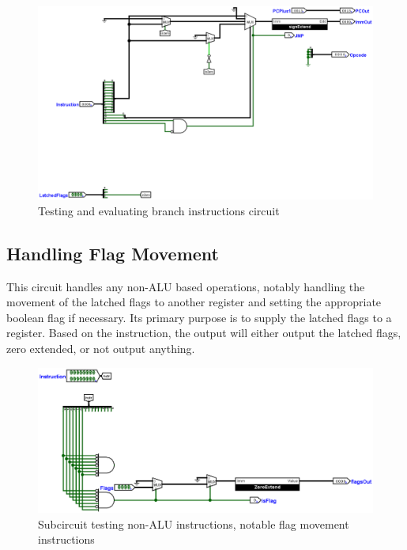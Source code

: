 \documentclass[12pt, letter]{article}
\begin{document}
 	  \begin{figure}[h]
 	  	\centering
 	  	\includegraphics[scale = 0.25]{ConditionalCircuit}
 	  	\caption{Testing and evaluating branch instructions circuit}
 	  	\label{fig:ConditionalCircuit}
 	  \end{figure}
   
   \subsection{Handling Flag Movement}
   
   This circuit handles any non-ALU based operations, notably handling the movement of the latched flags to another register and setting the appropriate boolean flag if necessary. Its primary purpose is to supply the latched flags to a register. Based on the instruction, the output will either output the latched flags, zero extended, or not output anything. 
   
   \begin{figure}[h]
   	\centering
   	\includegraphics[scale = 0.35]{NonALUOps}
   	\caption{Subcircuit testing non-ALU instructions, notable flag movement instructions}
   	\label{fig:NonALUOps}
   \end{figure}
	
\end{document}
